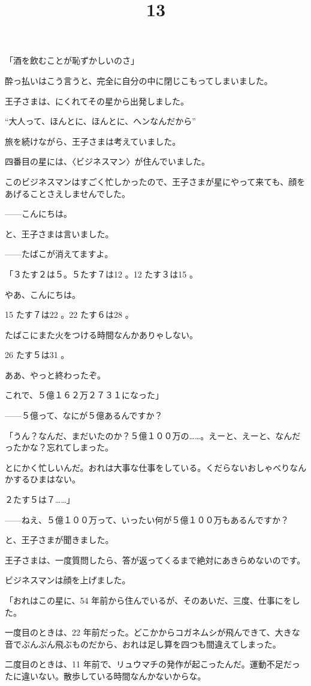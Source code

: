 「酒を飲むことが恥ずかしいのさ」

酔っ払いはこう言うと、完全に自分の中に閉じこもってしまいました。

王子さまは、にくれてその星から出発しました。

“大人って、ほんとに、ほんとに、へンなんだから”

旅を続けながら、王子さまは考えていました。
\title{13}

四番目の星には、〈ビジネスマン〉が住んでいました。

このビジネスマンはすごく忙しかったので、王子さまが星にやって来ても、顔をあげることさえしませんでした。

——こんにちは。

と、王子さまは言いました。

——たばこが消えてますよ。

「３たす２は５。５たす７は12 。12 たす３は15 。

やあ、こんにちは。

15 たす７は22 。22 たす６は28 。

たばこにまた火をつける時間なんかありゃしない。

26 たす５は31 。

ああ、やっと終わったぞ。

これで、５億１６２万２７３１になった」

——５億って、なにが５億あるんですか？

「うん？なんだ、まだいたのか？５億１００万の……。えーと、えーと、なんだったかな？忘れてしまった。

とにかく忙しいんだ。おれは大事な仕事をしている。くだらないおしゃべりなんかするひまはない。

２たす５は７……」

——ねえ、５億１００万って、いったい何が５億１００万もあるんですか？

と、王子さまが聞きました。

王子さまは、一度質問したら、答が返ってくるまで絶対にあきらめないのです。

ビジネスマンは顔を上げました。

「おれはこの星に、54 年前から住んでいるが、そのあいだ、三度、仕事にをした。

一度目のときは、22 年前だった。どこかからコガネムシが飛んできて、大きな音でぶんぶん飛ぶものだから、おれは足し算を四つも間違えてしまった。

二度目のときは、11 年前で、リュウマチの発作が起こったんだ。運動不足だったに違いない。散歩している時間なんかないからな。

